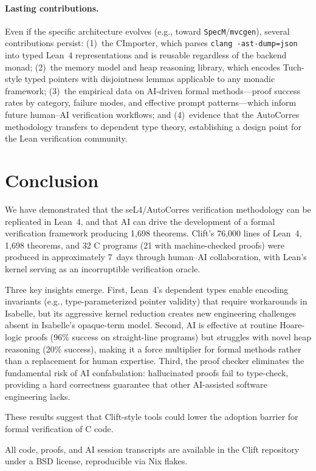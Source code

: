 \documentclass[sigconf,nonacm,screen]{acmart}
\begin{document}
\paragraph{Lasting contributions.}
Even if the specific architecture evolves (e.g., toward \texttt{SpecM}/\texttt{mvcgen}),
several contributions persist: (1)~the CImporter, which parses
\texttt{clang -ast-dump=json} into typed Lean~4 representations and is
reusable regardless of the backend monad; (2)~the memory model and heap
reasoning library, which encodes Tuch-style typed pointers with
disjointness lemmas applicable to any monadic framework; (3)~the
empirical data on AI-driven formal methods---proof success rates by
category, failure modes, and effective prompt patterns---which inform
future human--AI verification workflows; and (4)~evidence that the
AutoCorres methodology transfers to dependent type theory, establishing
a design point for the Lean verification community.

\section{Conclusion}

We have demonstrated that the seL4/AutoCorres verification methodology
can be replicated in Lean~4, and that AI can drive the development of
a formal verification framework producing 1,698 theorems. Clift's
76,000 lines of Lean~4, 1,698 theorems, and 32 C programs
(21 with machine-checked proofs)
were produced in approximately 7~days through human--AI collaboration,
with Lean's kernel serving as an incorruptible verification oracle.

Three key insights emerge. First, Lean~4's dependent types enable
encoding invariants (e.g., type-parameterized pointer validity) that
require workarounds in Isabelle, but its aggressive kernel reduction
creates new engineering challenges absent in Isabelle's opaque-term
model. Second, AI is effective at routine Hoare-logic proofs (96\%
success on straight-line programs) but struggles with novel heap
reasoning (20\% success), making it a force multiplier for formal
methods rather than a replacement for human expertise. Third, the
proof checker eliminates the fundamental risk of AI confabulation:
hallucinated proofs fail to type-check, providing a hard correctness
guarantee that other AI-assisted software engineering lacks.

These results suggest that Clift-style tools could lower the adoption
barrier for formal verification of C code.

All code, proofs, and AI session transcripts are available in the Clift
repository~\cite{clift2026} under a BSD license, reproducible via Nix flakes.



\end{document}
